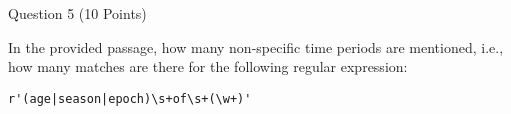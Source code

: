 \documentclass{article}
\begin{document}

\vspace{2cm}


\begin{minipage}{\textwidth}
    \noindent
    Question 5 (10 Points)
    \vspace{0.5cm}

    \noindent
    In the provided passage, how many non-specific time periods are mentioned,
    i.e., how many matches are there for the following regular expression:

    \vspace{0.5cm}

    \begin{lstlisting}
r'(age|season|epoch)\s+of\s+(\w+)'
    \end{lstlisting}

    \vspace{0.5cm}


\end{minipage}


\vspace{2cm}

\end{document}
